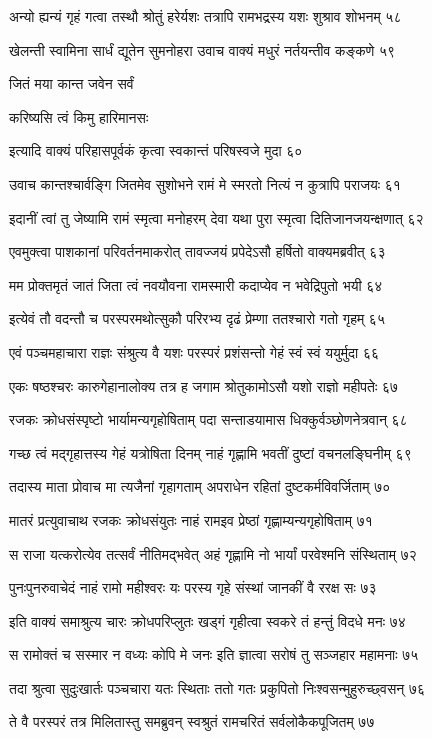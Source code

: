 अन्यो ह्यन्यं गृहं गत्वा तस्थौ श्रोतुं हरेर्यशः
तत्रापि रामभद्रस्य यशः शुश्राव शोभनम् ५८

खेलन्ती स्वामिना सार्धं द्यूतेन सुमनोहरा
उवाच वाक्यं मधुरं नर्तयन्तीव कङ्कणे ५९

जितं मया कान्त जवेन सर्वं

करिष्यसि त्वं किमु हारिमानसः

इत्यादि वाक्यं परिहासपूर्वकं
कृत्वा स्वकान्तं परिषस्वजे मुदा ६०

उवाच कान्तश्चार्वङ्गि जितमेव सुशोभने
रामं मे स्मरतो नित्यं न कुत्रापि पराजयः ६१

इदानीं त्वां तु जेष्यामि रामं स्मृत्वा मनोहरम्
देवा यथा पुरा स्मृत्वा दितिजानजयन्क्षणात् ६२

एवमुक्त्वा पाशकानां परिवर्तनमाकरोत्
तावज्जयं प्रपेदेऽसौ हर्षितो वाक्यमब्रवीत् ६३

मम प्रोक्तमृतं जातं जिता त्वं नवयौवना
रामस्मारी कदाप्येव न भवेद्रिपुतो भयी ६४

इत्येवं तौ वदन्तौ च परस्परमथोत्सुकौ
परिरभ्य दृढं प्रेम्णा ततश्चारो गतो गृहम् ६५

एवं पञ्चमहाचारा राज्ञः संश्रुत्य वै यशः
परस्परं प्रशंसन्तो गेहं स्वं स्वं ययुर्मुदा ६६

एकः षष्ठश्चरः कारुगेहानालोक्य तत्र ह
जगाम श्रोतुकामोऽसौ यशो राज्ञो महीपतेः ६७

रजकः क्रोधसंस्पृष्टो भार्यामन्यगृहोषिताम्
पदा सन्ताडयामास धिक्कुर्वञ्छोणनेत्रवान् ६८

गच्छ त्वं मद्गृहात्तस्य गेहं यत्रोषिता दिनम्
नाहं गृह्णामि भवतीं दुष्टां वचनलङ्घिनीम् ६९

तदास्य माता प्रोवाच मा त्यजैनां गृहागताम्
अपराधेन रहितां दुष्टकर्मविवर्जिताम् ७०

मातरं प्रत्युवाचाथ रजकः क्रोधसंयुतः
नाहं रामइव प्रेष्ठां गृह्णाम्यन्यगृहोषिताम् ७१

स राजा यत्करोत्येव तत्सर्वं नीतिमद्भवेत्
अहं गृह्णामि नो भार्यां परवेश्मनि संस्थिताम् ७२

पुनःपुनरुवाचेदं नाहं रामो महीश्वरः
यः परस्य गृहे संस्थां जानकीं वै ररक्ष सः ७३

इति वाक्यं समाश्रुत्य चारः क्रोधपरिप्लुतः
खड्गं गृहीत्वा स्वकरे तं हन्तुं विदधे मनः ७४

स रामोक्तं च सस्मार न वध्यः कोपि मे जनः
इति ज्ञात्वा सरोषं तु सञ्जहार महामनाः ७५

तदा श्रुत्वा सुदुःखार्तः पञ्चचारा यतः स्थिताः
ततो गतः प्रकुपितो निःश्वसन्मुहुरुच्छ्वसन् ७६

ते वै परस्परं तत्र मिलितास्तु समब्रुवन्
स्वश्रुतं रामचरितं सर्वलोकैकपूजितम् ७७

